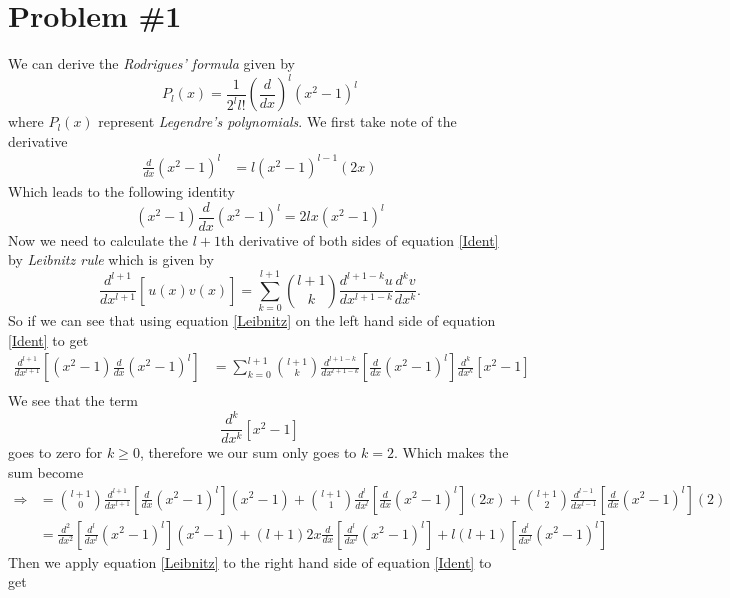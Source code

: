 \documentclass[11pt]{article}
\numberwithin{equation}{section}
\begin{document}


\section{Problem \#1}
We can derive the \emph{Rodrigues' formula} given by
\begin{equation}
P_l(x) = \frac{1}{2^ll!}\left(\frac{d}{dx}\right)^l(x^2-1)^l
\label{RodForm}
\end{equation}
where $P_l(x)$ represent \emph{Legendre's polynomials}. We first take note of the derivative
\begin{align*}
\frac{d}{dx}(x^2-1)^{l} &= l(x^2-1)^{l-1}(2x)
\end{align*}
Which leads to the following identity 
\begin{equation}
(x^2-1)\frac{d}{dx}(x^2-1)^l = 2lx(x^2-1)^l
\label{Ident}
\end{equation}
Now we need to calculate the $l+1$th derivative of both sides of equation \ref{Ident} by 
\emph{Leibnitz rule} which is given by
\begin{equation}
\frac{d^{l+1}}{dx^{l+1}}\left[\frac{}{}u(x)v(x)\right] = \sum_{k=0}^{l+1}{l+1\choose{k}}\frac{d^{l+1-k}u}{dx^{l+1-k}}\frac{d^kv}{dx^k}.
\label{Leibnitz}
\end{equation}
So if we can see that using equation \ref{Leibnitz} on the left hand side of equation 
\ref{Ident} to get
\begin{align*}
\frac{d^{l+1}}{dx^{l+1}}\left[(x^2-1)\frac{d}{dx}(x^2-1)^l\right] &= \sum_{k=0}^{l+1}{l+1\choose{k}}\frac{d^{l+1-k}}{dx^{l+1-k}}\left[\frac{d}{dx}(x^2-1)^l\right]\frac{d^k}{dx^k}\left[x^2-1\right]\\
\end{align*}
We see that the term 
$$\frac{d^k}{dx^k}\left[x^2-1\right]$$
goes to zero for $k\ge0$, therefore we our sum only goes to $k=2$. Which makes the sum become
\begin{align*}
\Rightarrow &= {l+1\choose{0}}\frac{d^{l+1}}{dx^{l+1}}\left[\frac{d}{dx}(x^2-1)^l\right]\left(x^2-1\right)
        + {l+1\choose{1}}\frac{d^{l}}{dx^{l}}\left[\frac{d}{dx}(x^2-1)^l\right](2x) 
        + {l+1\choose{2}}\frac{d^{l-1}}{dx^{l-1}}\left[\frac{d}{dx}(x^2-1)^l\right](2)\\
&= \frac{d^{2}}{dx^{2}}\left[\frac{d^l}{dx^l}(x^2-1)^l\right]\left(x^2-1\right)
        + (l+1)2x\frac{d}{dx}\left[\frac{d^l}{dx^l}(x^2-1)^l\right]
        + l(l+1)\left[\frac{d^{l}}{dx^{l}}(x^2-1)^l\right]
\end{align*}
Then we apply equation \ref{Leibnitz} to the right hand side of equation \ref{Ident} to get
\end{document}

